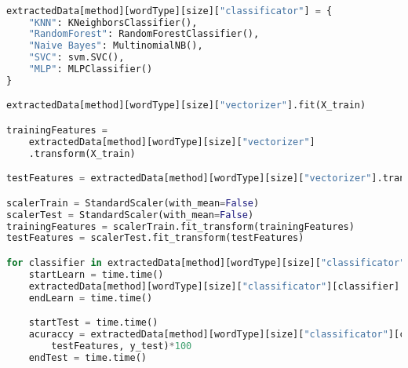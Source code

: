 \begin{lstlisting}[language=Python, caption={Główna pętla programu iterująca po wszystkich badanych metodach i wykonująca na nich pomiary}, captionpos=b, frame=single]

extractedData[method][wordType][size]["classificator"] = {
    "KNN": KNeighborsClassifier(),
    "RandomForest": RandomForestClassifier(),
    "Naive Bayes": MultinomialNB(),
    "SVC": svm.SVC(),
    "MLP": MLPClassifier()
}

extractedData[method][wordType][size]["vectorizer"].fit(X_train)

trainingFeatures = 
    extractedData[method][wordType][size]["vectorizer"]
    .transform(X_train)

testFeatures = extractedData[method][wordType][size]["vectorizer"].transform(X_test)

scalerTrain = StandardScaler(with_mean=False)
scalerTest = StandardScaler(with_mean=False)
trainingFeatures = scalerTrain.fit_transform(trainingFeatures)
testFeatures = scalerTest.fit_transform(testFeatures)

for classifier in extractedData[method][wordType][size]["classificator"].keys():
    startLearn = time.time()
    extractedData[method][wordType][size]["classificator"][classifier].fit(trainingFeatures, y_train)
    endLearn = time.time()

    startTest = time.time()
    acuraccy = extractedData[method][wordType][size]["classificator"][classifier].score(
        testFeatures, y_test)*100
    endTest = time.time()
\end{lstlisting}